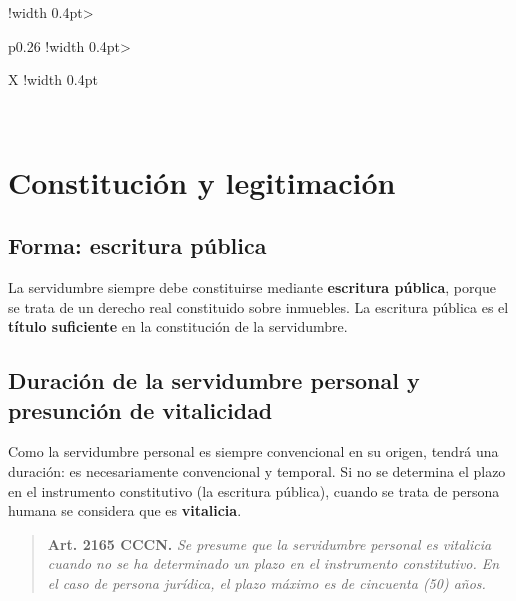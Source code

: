 \documentclass[12pt,oneside]{book}
\begin{document}
\begin{table}[H]
\begin{tabularx}{\textwidth}{
    !{\vrule width 0.4pt}>{\raggedright\arraybackslash}p{0.26\textwidth}
    !{\vrule width 0.4pt}>{\raggedright\arraybackslash}X
    !{\vrule width 0.4pt}
}
\midrule

 \\

\bottomrule
\end{tabularx}
\end{table}

\chapter[Constitución y legitimación]{Constitución y legitimación}

\section{Forma: escritura pública}

La servidumbre siempre debe constituirse mediante \textbf{escritura pública}, porque se trata de un derecho real constituido sobre inmuebles. La escritura pública es el \textbf{título suficiente} en la constitución de la servidumbre.

\section{Duración de la servidumbre personal y presunción de vitalicidad}

Como la servidumbre personal es siempre convencional en su origen, tendrá una duración: es necesariamente convencional y temporal. Si no se determina el plazo en el instrumento constitutivo (la escritura pública), cuando se trata de persona humana se considera que es \textbf{vitalicia}.

\begin{quote}
\textbf{Art. 2165 CCCN.} \textit{Se presume que la servidumbre personal es vitalicia cuando no se ha determinado un plazo en el instrumento constitutivo. En el caso de persona jurídica, el plazo máximo es de cincuenta (50) años.}
\end{quote}
\end{document}
